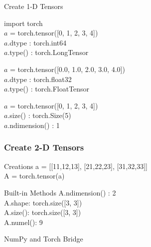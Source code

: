 \documentclass[14 pt]{beamer}
\begin{document}
\begin{frame}{Create 1-D Tensors}
\begin{block}{}
import torch \\
$a$ = torch.tensor([0, 1, 2, 3, 4])\\
$a$.dtype : torch.int64 \\
$a$.type() : torch.LongTensor
\end{block}
\begin{block}{}
$a$ = torch.tensor([0.0, 1.0, 2.0, 3.0, 4.0])\\
$a$.dtype :  torch.float32 \\
$a$.type() : torch.FloatTensor
\end{block}

\begin{block}{}
$a$ = torch.tensor([0, 1, 2, 3, 4])\\
$a$.size() : torch.Size(5) \\
$a$.ndimension() : 1
\end{block}
\end{frame}


\begin{frame}
  \frametitle{ Create 2-D Tensors}
  \begin{block}{Creations}
    a = [[11,12,13], [21,22,23], [31,32,33]]\\
    A = torch.tensor(a) 
  \end{block}

\begin{block}{Built-in Methods}
  A.ndimension() : 2 \\
    A.shape: torch.size([3, 3]) \\
    A.size(): torch.size([3, 3]) \\
    A.numel(): 9 \\
  \end{block}
\end{frame}

\begin{frame}
\begin{center}
\Large{NumPy and Torch Bridge}
\end{center}
\end{frame}
\end{document}
